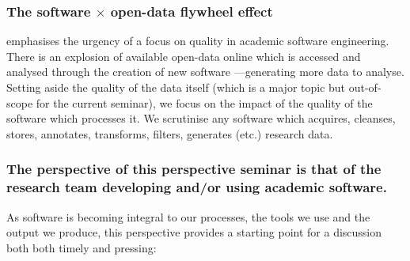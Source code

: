 \documentclass[a4paper,UKenglish]{dagman}
\renewcommand{\paragraph}[1]{\subsubsection*{#1}\xspace}
\begin{document}
\paragraph{The software $\times$ open-data flywheel effect} emphasises the urgency of a focus on quality in academic software engineering. There is an explosion of available open-data online which is accessed and analysed through the creation of new software ---generating more data to analyse. Setting aside the quality of the data itself (which is a major topic but out-of-scope for the current seminar), we focus on the impact of the quality of the software which processes it. We scrutinise any software which acquires, cleanses, stores, annotates, transforms, filters, generates (etc.) research data.

\paragraph{The perspective of this perspective seminar is that of the research team developing and/or using academic software.} As software is becoming integral to our processes, the tools we use and the output we produce, this perspective provides a starting point for a discussion both both timely and pressing:
\end{document}

